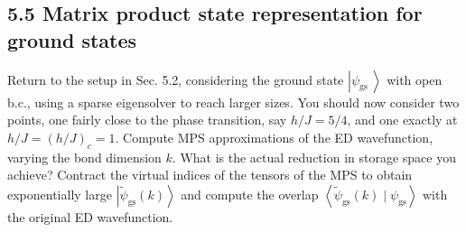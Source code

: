 \documentclass[12pt]{article}
\begin{document}
\subsection*{5.5 Matrix product state representation for ground states}
Return to the setup in Sec. 5.2, considering the ground state $\left|\psi_{\text {gs }}\right\rangle$ with open b.c., using a sparse eigensolver to reach larger sizes. You should now consider two points, one fairly close to the phase transition, say $h / J=5 / 4$, and one exactly at $h / J=(h / J)_{c}=1$. Compute MPS approximations of the ED wavefunction, varying the bond dimension $k$. What is the actual reduction in storage space you achieve? Contract the virtual indices of the tensors of the MPS to obtain exponentially large $\left|\tilde{\psi}_{\mathrm{gs}}(k)\right\rangle$ and compute the overlap $\left\langle\tilde{\psi}_{\mathrm{gs}}(k) \mid \psi_{\mathrm{gs}}\right\rangle$ with the original ED wavefunction.
\end{document}
